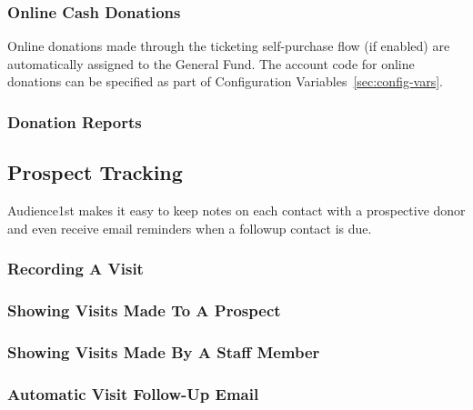 \subsubsection{Online Cash Donations}
\label{sec:online_donations}

Online donations made through the ticketing self-purchase flow (if
enabled) are automatically assigned to the General Fund. The account
code for online donations can be specified as part of Configuration
Variables~\ref{sec:config-vars}.

\subsubsection{Donation Reports}
\label{sec:donation_search}

\subsection{Prospect Tracking}
\label{sec:prospect_tracking}

Audience1st makes it easy to keep notes on each contact with a
prospective donor and even receive email reminders when a followup
contact is due.

\subsubsection{Recording A Visit}
\label{sec:prospect_visit}

\subsubsection{Showing Visits Made To A Prospect}

\subsubsection{Showing Visits Made By A Staff Member}

\subsubsection{Automatic Visit Follow-Up Email}

